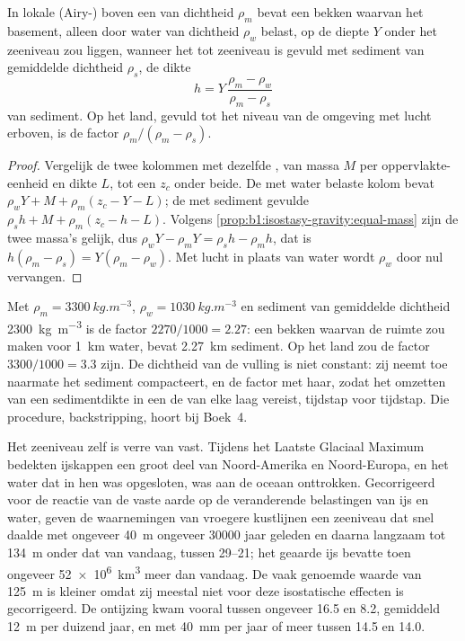\begin{proposition}\label{prop:b1:diagenesis-basins:loading}
In lokale (Airy-) boven een  van dichtheid $\rho_m$ bevat een bekken waarvan het basement, alleen door water van dichtheid $\rho_w$ belast, op de diepte $Y$ onder het zeeniveau zou liggen, wanneer het tot zeeniveau is gevuld met sediment van gemiddelde dichtheid $\rho_s$, de dikte
\[
  h = Y\,\frac{\rho_m - \rho_w}{\rho_m - \rho_s}
\]
van sediment. Op het land, gevuld tot het niveau van de omgeving met lucht erboven, is de factor $\rho_m/(\rho_m - \rho_s)$.
\end{proposition}

\begin{proof}
Vergelijk de twee kolommen met dezelfde , van massa $M$ per oppervlakte-eenheid en dikte $L$, tot een  $z_c$ onder beide. De met water belaste kolom bevat $\rho_w Y + M + \rho_m(z_c - Y - L)$; de met sediment gevulde $\rho_s h + M + \rho_m(z_c - h - L)$. Volgens \cref{prop:b1:isostasy-gravity:equal-mass} zijn de twee massa's gelijk, dus
$\rho_w Y - \rho_m Y = \rho_s h - \rho_m h$, dat is $h(\rho_m - \rho_s) =
Y(\rho_m - \rho_w)$. Met lucht in plaats van water wordt $\rho_w$ door nul vervangen.
\end{proof}

Met $\rho_m = \qty{3300}{kg.m^{-3}}$, $\rho_w = \qty{1030}{kg.m^{-3}}$ en sediment van gemiddelde dichtheid \qty{2300}{kg.m^{-3}} is de factor
$2270/1000 = \num{2.27}$: een bekken waarvan de  ruimte zou maken voor \qty{1}{km} water, bevat \qty{2.27}{km} sediment. Op het land zou de factor $3300/1000 = \num{3.3}$ zijn. De dichtheid van de vulling is niet constant: zij neemt toe naarmate het sediment compacteert, en de factor met haar, zodat het omzetten van een sedimentdikte in een  de  van elke laag vereist, tijdstap voor tijdstap. Die procedure, backstripping, hoort bij Boek~4.

Het zeeniveau zelf is verre van vast. Tijdens het Laatste Glaciaal Maximum bedekten ijskappen een groot deel van Noord-Amerika en Noord-Europa, en het water dat in hen was opgesloten, was aan de oceaan onttrokken. Gecorrigeerd voor de reactie van de vaste aarde op de veranderende belastingen van ijs en water, geven de waarnemingen van vroegere kustlijnen een zeeniveau dat snel daalde met ongeveer \qty{40}{m} ongeveer \num{30000} jaar geleden en daarna langzaam tot \qty{134}{m} onder dat van vandaag, tussen \qtyrange{29}{21}{\ka}; het geaarde ijs bevatte toen ongeveer \qty{52e6}{km^3} meer dan vandaag. De vaak genoemde waarde van \qty{125}{m} is kleiner omdat zij meestal niet voor deze isostatische effecten is gecorrigeerd. De ontijzing kwam vooral tussen ongeveer \qty{16.5}{\ka} en \qty{8.2}{\ka}, gemiddeld \qty{12}{m} per duizend jaar, en met \qty{40}{mm} per jaar of meer tussen \qty{14.5}{\ka} en \qty{14.0}{\ka}.

